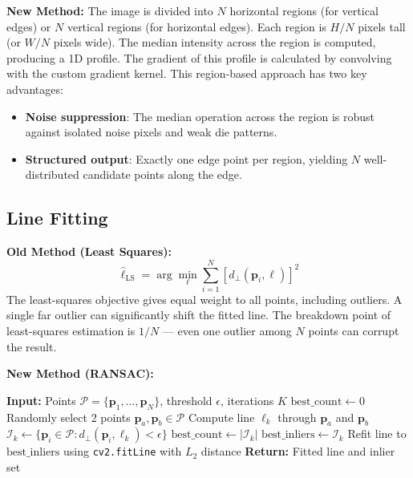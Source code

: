 \documentclass[12pt, a4paper]{article}
\begin{document}
\textbf{New Method:} The image is divided into $N$ horizontal regions (for vertical edges) or $N$ vertical regions (for horizontal edges). Each region is $H/N$ pixels tall (or $W/N$ pixels wide). The median intensity across the region is computed, producing a 1D profile. The gradient of this profile is calculated by convolving with the custom gradient kernel. This region-based approach has two key advantages:
\begin{itemize}
    \item \textbf{Noise suppression}: The median operation across the region is robust against isolated noise pixels and weak die patterns.
    \item \textbf{Structured output}: Exactly one edge point per region, yielding $N$ well-distributed candidate points along the edge.
\end{itemize}

\subsection{Line Fitting}

\textbf{Old Method (Least Squares):}
\begin{equation}
    \hat{\ell}_{\text{LS}} = \arg\min_\ell \sum_{i=1}^{N} \left[ d_\perp(\mathbf{p}_i, \ell) \right]^2
\end{equation}
The least-squares objective gives equal weight to all points, including outliers. A single far outlier can significantly shift the fitted line. The breakdown point of least-squares estimation is $1/N$ — even one outlier among $N$ points can corrupt the result.

\textbf{New Method (RANSAC):}
\begin{algorithm}[H]
\caption{RANSAC Line Fitting}
\label{alg:ransac}
\begin{algorithmic}[1]
\State \textbf{Input:} Points $\mathcal{P} = \{\mathbf{p}_1, \ldots, \mathbf{p}_N\}$, threshold $\epsilon$, iterations $K$
\State $\text{best\_count} \gets 0$
    \State Randomly select 2 points $\mathbf{p}_a, \mathbf{p}_b \in \mathcal{P}$
    \State Compute line $\ell_k$ through $\mathbf{p}_a$ and $\mathbf{p}_b$
    \State $\mathcal{I}_k \gets \{\mathbf{p}_i \in \mathcal{P} : d_\perp(\mathbf{p}_i, \ell_k) < \epsilon\}$
        \State $\text{best\_count} \gets |\mathcal{I}_k|$
        \State $\text{best\_inliers} \gets \mathcal{I}_k$
    \EndIf
\EndFor
\State Refit line to $\text{best\_inliers}$ using \texttt{cv2.fitLine} with $L_2$ distance
\State \textbf{Return:} Fitted line and inlier set
\end{algorithmic}
\end{algorithm}
\end{document}
